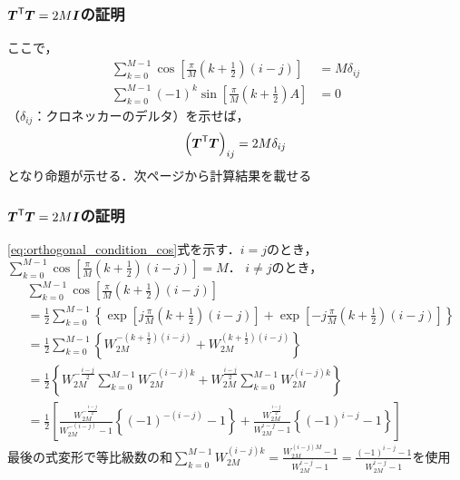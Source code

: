 \documentclass[14pt,xcolor=dvipsnames,table,dvipdfmx]{beamer}
\begin{document}
\begin{frame}[c]
    \frametitle{$\boldsymbol{T}^{\mathsf{T}} \boldsymbol{T} = 2M\boldsymbol{I}$の証明}
    ここで，
    \begin{align}
        \sum_{k = 0}^{M - 1}\cos\left[ \frac{\pi}{M} \left( k + \frac{1}{2} \right) \left( i - j \right) \right] &= M\delta_{ij} \label{eq:orthogonal_condition_cos} \\
        \sum_{k = 0}^{M - 1}(-1)^{k} \sin \left[ \frac{\pi}{M} \left( k + \frac{1}{2} \right)A \right] &= 0 \label{eq:orthogonal_condition_sin}
    \end{align}
    （$\delta_{ij}$：クロネッカーのデルタ）を示せば，
    \begin{align*}
        \left( \boldsymbol{T}^{\mathsf{T}} \boldsymbol{T} \right)_{ij} = 2M \delta_{ij}
    \end{align*}
    となり命題が示せる．次ページから計算結果を載せる
\end{frame}

\begin{frame}[c]
    \frametitle{$\boldsymbol{T}^{\mathsf{T}} \boldsymbol{T} = 2M\boldsymbol{I}$の証明}
    \eqref{eq:orthogonal_condition_cos}式を示す．$i = j$のとき，
    \scriptsize
    $\sum_{k = 0}^{M - 1} \cos\left[ \frac{\pi}{M} \left( k + \frac{1}{2} \right) ( i - j ) \right] = M$．
    \normalsize
    $i \neq j$のとき，
    \scriptsize
    \begin{align*}
        & \sum_{k = 0}^{M - 1} \cos\left[ \frac{\pi}{M} \left( k + \frac{1}{2} \right) ( i - j ) \right] \\
        &= \frac{1}{2} \sum_{k = 0}^{M - 1} \left\{ \exp\left[ j \frac{\pi}{M}  \left( k + \frac{1}{2} \right) (i - j) \right] + \exp\left[ -j \frac{\pi}{M} \left( k + \frac{1}{2} \right) (i - j) \right] \right\} \\
        &= \frac{1}{2} \sum_{k = 0}^{M - 1} \left\{ W_{2M}^{-\left( k + \frac{1}{2} \right)(i - j)} + W_{2M}^{\left( k + \frac{1}{2} \right)(i - j)} \right\} \nonumber \\
        &= \frac{1}{2} \left\{ W_{2M}^{-\frac{i - j}{2}} \sum_{k = 0}^{M - 1} W_{2M}^{-(i - j)k} + W_{2M}^{\frac{i - j}{2}} \sum_{k = 0}^{M - 1} W_{2M}^{(i - j)k} \right\} \\
        &= \frac{1}{2} \left[ \frac{W_{2M}^{-\frac{i - j}{2}}}{W_{2M}^{-(i - j)} - 1} \left\{ (-1)^{-(i - j)} - 1 \right\} + \frac{W_{2M}^{\frac{i - j}{2}}}{W_{2M}^{i - j} - 1} \left\{ (-1)^{i - j} - 1 \right\} \right]
    \end{align*}
    最後の式変形で等比級数の和$\sum_{k = 0}^{M - 1} W_{2M}^{(i - j)k} = \frac{W_{2M}^{(i -j)M} - 1}{W_{2M}^{i - j} - 1} = \frac{(-1)^{i - j} - 1}{W_{2M}^{i - j} - 1}$を使用
\end{frame}
\end{document}
